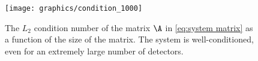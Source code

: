 \begin{figure}[htbp] 
   \centering
   \texttt{[image: graphics/condition\_1000]} 
   \caption{The $L_{2}$ condition number of the matrix $\A$ in \eqref{eq:system matrix} as a function of the size of the matrix. The system is well-conditioned, even for an extremely large number of detectors.}
   \label{fig:example}
\end{figure}

\endinput  %